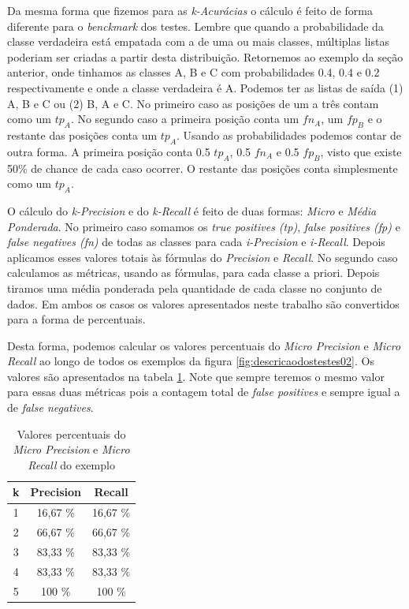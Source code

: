 Da mesma forma que fizemos para as \textit{k-Acurácias} o cálculo é feito de forma diferente para o \textit{benckmark} dos testes.
Lembre que quando a probabilidade da classe verdadeira está empatada com a de uma ou mais classes, múltiplas listas poderiam ser criadas a partir desta distribuição.
Retornemos ao exemplo da seção anterior, onde tinhamos as classes A, B e C com probabilidades 0.4, 0.4 e 0.2 respectivamente e onde a classe verdadeira é A.
Podemos ter as listas de saída (1) A, B e C ou (2) B, A e C.
No primeiro caso as posições de um a três contam como um $tp_A$.
No segundo caso a primeira posição conta um $fn_A$, um $fp_B$ e o restante das posições conta um $tp_A$.
Usando as probabilidades podemos contar de outra forma.
A primeira posição conta 0.5 $tp_A$, 0.5 $fn_A$ e 0.5 $fp_B$, visto que existe 50\% de chance de cada caso ocorrer.
O restante das posições conta simplesmente como um $tp_A$.

O cálculo do \textit{k-Precision} e do \textit{k-Recall} é feito de duas formas: \textit{Micro} e \textit{Média Ponderada}.
No primeiro caso somamos os \textit{true positives (tp)}, \textit{false positives (fp)} e \textit{false negatives (fn)} de todas as classes para cada \textit{i-Precision} e \textit{i-Recall}.
Depois aplicamos esses valores totais às fórmulas do \textit{Precision} e \textit{Recall}.
No segundo caso calculamos as métricas, usando as fórmulas, para cada classe a priori.
Depois tiramos uma média ponderada pela quantidade de cada classe no conjunto de dados.
Em ambos os casos os valores apresentados neste trabalho são convertidos para a forma de percentuais.

Desta forma, podemos calcular os valores percentuais do \textit{Micro Precision} e \textit{Micro Recall} ao longo de todos os exemplos da figura \ref{fig:descricaodostestes02}.
Os valores são apresentados na tabela \ref{tab:valores_micro}.
Note que sempre teremos o mesmo valor para essas duas métricas pois a contagem total de \textit{false positives} e sempre igual a de \textit{false negatives}.

\begin{table}[h!]
  \begin{center}
    \begin{tabular}{ccc}
      \hline
      \textbf{k} & \textbf{Precision} & \textbf{Recall} \\
      \hline

      1 & 16,67 \% & 16,67 \% \\
      2 & 66,67 \% & 66,67 \% \\
      3 & 83,33 \% & 83,33 \% \\
      4 & 83,33 \% & 83,33 \% \\
      5 & 100 \% & 100 \% \\

      \hline
    \end{tabular}
    \caption{Valores percentuais do \textit{Micro Precision} e \textit{Micro Recall} do exemplo}
    \label{tab:valores_micro}
  \end{center}
\end{table}

